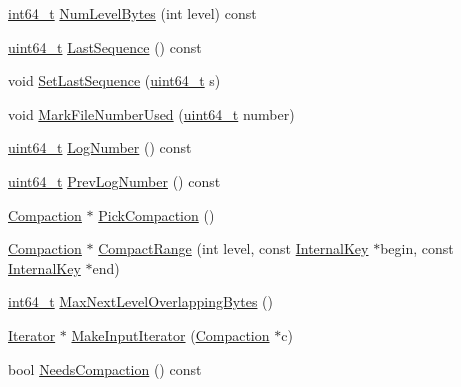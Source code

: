 \begin{DoxyCompactItemize}
\item 
\hyperlink{stdint_8h_adec1df1b8b51cb32b77e5b86fff46471}{int64\-\_\-t} \hyperlink{classleveldb_1_1_version_set_adfe3e1061becd9e2756b2dd4447b52e0}{Num\-Level\-Bytes} (int level) const 
\item 
\hyperlink{stdint_8h_aaa5d1cd013383c889537491c3cfd9aad}{uint64\-\_\-t} \hyperlink{classleveldb_1_1_version_set_acbbb32422426416b0d5e58d35b151526}{Last\-Sequence} () const 
\item 
void \hyperlink{classleveldb_1_1_version_set_a2234860e72a1ac7361d7bee107da6a07}{Set\-Last\-Sequence} (\hyperlink{stdint_8h_aaa5d1cd013383c889537491c3cfd9aad}{uint64\-\_\-t} s)
\item 
void \hyperlink{classleveldb_1_1_version_set_a8a009a58938b12c7a69bda2b4da115a0}{Mark\-File\-Number\-Used} (\hyperlink{stdint_8h_aaa5d1cd013383c889537491c3cfd9aad}{uint64\-\_\-t} number)
\item 
\hyperlink{stdint_8h_aaa5d1cd013383c889537491c3cfd9aad}{uint64\-\_\-t} \hyperlink{classleveldb_1_1_version_set_a0ff6a25abcf0b0c7d94bd425b6fb0ef2}{Log\-Number} () const 
\item 
\hyperlink{stdint_8h_aaa5d1cd013383c889537491c3cfd9aad}{uint64\-\_\-t} \hyperlink{classleveldb_1_1_version_set_a0c2a382650ba2b987d8059faacbd0c39}{Prev\-Log\-Number} () const 
\item 
\hyperlink{classleveldb_1_1_compaction}{Compaction} $\ast$ \hyperlink{classleveldb_1_1_version_set_a1cdc6a05e0a7df9f29b5bccd485a0219}{Pick\-Compaction} ()
\item 
\hyperlink{classleveldb_1_1_compaction}{Compaction} $\ast$ \hyperlink{classleveldb_1_1_version_set_a3a03f9a6c86e861be314cf8e01f33142}{Compact\-Range} (int level, const \hyperlink{classleveldb_1_1_internal_key}{Internal\-Key} $\ast$begin, const \hyperlink{classleveldb_1_1_internal_key}{Internal\-Key} $\ast$end)
\item 
\hyperlink{stdint_8h_adec1df1b8b51cb32b77e5b86fff46471}{int64\-\_\-t} \hyperlink{classleveldb_1_1_version_set_a32dc1a7e1eaeeeac89286be3483ad612}{Max\-Next\-Level\-Overlapping\-Bytes} ()
\item 
\hyperlink{classleveldb_1_1_iterator}{Iterator} $\ast$ \hyperlink{classleveldb_1_1_version_set_a181194e96a88e69a60c1fda9cf3c4651}{Make\-Input\-Iterator} (\hyperlink{classleveldb_1_1_compaction}{Compaction} $\ast$c)
\item 
bool \hyperlink{classleveldb_1_1_version_set_aa2976498024282e1449dcba88c6df162}{Needs\-Compaction} () const 
\item 

\end{DoxyCompactItemize}
